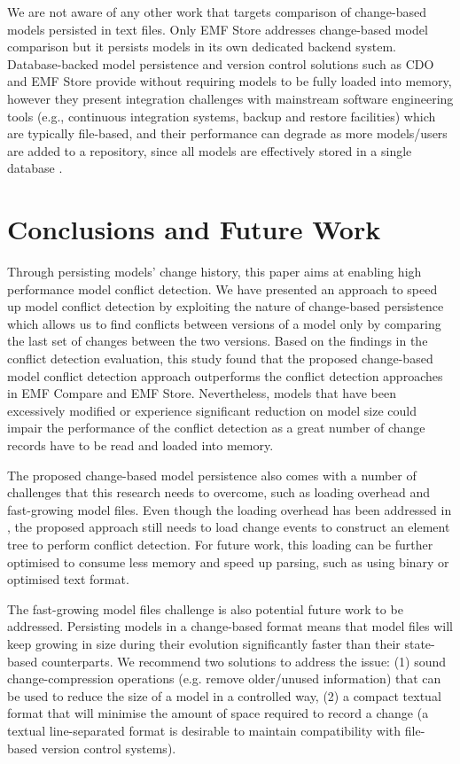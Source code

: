 We are not aware of any other work that targets comparison of change-based models persisted in text files. Only EMF Store \cite{koegel2010emfstore}  addresses change-based model comparison but it persists models in its own dedicated backend system. Database-backed model persistence and version control solutions such as CDO \cite{eclipse2019cdo} and EMF Store provide without requiring models to be fully loaded into memory, however they present integration challenges with mainstream software engineering tools (e.g., continuous integration systems, backup and restore facilities) which are typically file-based, and their performance can degrade as more models/users are added to a repository, since all models are effectively stored in a single database \cite{KolovosRMPGCLRV13}. 

\section{Conclusions and Future Work}
\label{sec:conclusions_and_future_work}
Through persisting models' change history, this paper aims at enabling high performance model conflict detection. We have presented an approach to speed up model conflict detection by exploiting the nature of change-based persistence which allows us to find conflicts between versions of a model only by comparing the last set of changes between the two versions. Based on the findings in the conflict detection evaluation, this study found that the proposed change-based model conflict detection approach outperforms the conflict detection approaches in EMF Compare and EMF Store. Nevertheless, models that have been excessively modified or experience significant reduction on model size could impair the performance of the conflict detection as a great number of change records have to be read and loaded into memory. 

The proposed change-based model persistence also comes with a number of challenges that this research needs to overcome, such as loading overhead and fast-growing model files. Even though the loading overhead has been addressed in \cite{DBLP:conf/models/YohannisRPK18}, the proposed approach still needs to load change events to construct an element tree to perform conflict detection. For future work, this loading can be further optimised to consume less memory and speed up parsing, such as using binary or optimised text format.

The fast-growing model files challenge is also potential future work to be addressed. Persisting models in a change-based format means that model files will keep growing in size during their evolution significantly faster than their state-based counterparts. We recommend two solutions to address the issue: (1) sound change-compression operations (e.g. remove older/unused information) that can be used to reduce the size of a model in a controlled way, (2) a compact textual format that will minimise the amount of space required to record a change (a textual line-separated format is desirable to maintain compatibility with file-based version control systems). 

